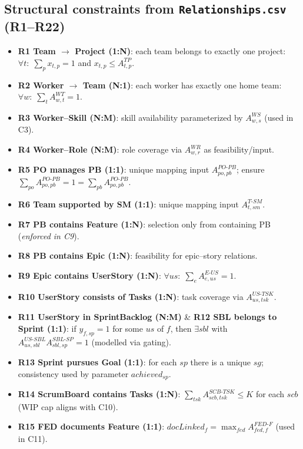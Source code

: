 \documentclass[11pt,a4paper]{article}
\begin{document}
\subsection*{Structural constraints from \texttt{Relationships.csv} (R1--R22)}
\begin{itemize}[leftmargin=2em]
  \item \textbf{R1 Team $\to$ Project (1:N)}: each team belongs to exactly one project: \quad $\forall t:\; \sum_{p} x_{t,p}=1$ and $x_{t,p}\le A^{TP}_{t,p}$.
  \item \textbf{R2 Worker $\to$ Team (N:1)}: each worker has exactly one home team: \quad $\forall w:\; \sum_{t} A^{WT}_{w,t}=1$.
  \item \textbf{R3 Worker--Skill (N:M)}: skill availability parameterized by $A^{WS}_{w,s}$ (used in C3).
  \item \textbf{R4 Worker--Role (N:M)}: role coverage via $A^{WR}_{w,r}$ as feasibility/input.
  \item \textbf{R5 PO manages PB (1:1)}: unique mapping input $A^{PO\text{-}PB}_{po,pb}$; ensure $\sum_{po} A^{PO\text{-}PB}_{po,pb}=1=\sum_{pb} A^{PO\text{-}PB}_{po,pb}$.
  \item \textbf{R6 Team supported by SM (1:1)}: unique mapping input $A^{T\text{-}SM}_{t,sm}$.
  \item \textbf{R7 PB contains Feature (1:N)}: selection only from containing PB (\textit{enforced in C9}).
  \item \textbf{R8 PB contains Epic (1:N)}: feasibility for epic--story relations.
  \item \textbf{R9 Epic contains UserStory (1:N)}: $\forall us:\; \sum_{e} A^{E\text{-}US}_{e,us}=1$.
  \item \textbf{R10 UserStory consists of Tasks (1:N)}: task coverage via $A^{US\text{-}TSK}_{us,tsk}$.
  \item \textbf{R11 UserStory in SprintBacklog (N:M)} \& \textbf{R12 SBL belongs to Sprint (1:1)}: if $y_{f,sp}=1$ for some $us$ of $f$, then $\exists sbl$ with $A^{US\text{-}SBL}_{us,sbl}A^{SBL\text{-}SP}_{sbl,sp}=1$ (modelled via gating).
  \item \textbf{R13 Sprint pursues Goal (1:1)}: for each $sp$ there is a unique $sg$; consistency used by parameter $achieved_{sp}$.
  \item \textbf{R14 ScrumBoard contains Tasks (1:N)}: $\sum_{tsk} A^{SCB\text{-}TSK}_{scb,tsk} \le K$ for each $scb$ (WIP cap aligns with C10).
  \item \textbf{R15 FED documents Feature (1:1)}: $docLinked_f = \max_{fed} A^{FED\text{-}F}_{fed,f}$ (used in C11).

\end{itemize}
\end{document}
